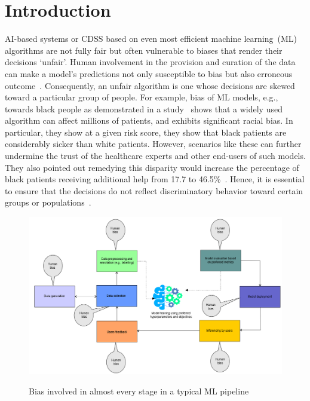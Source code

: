 \section{Introduction} \label{chapter_9:intro}
AI-based systems or CDSS based on even most efficient machine learning~(ML) algorithms are not fully fair but often vulnerable to biases that render their decisions `unfair'. Human involvement in the provision and curation of the data can make a model's predictions not only susceptible to bias but also erroneous outcome~\cite{futia2020integration}. Consequently, an unfair algorithm is one whose decisions are skewed toward a particular group of people. For example, bias of ML models, e.g., towards black people as demonstrated in a study~\cite{obermeyer2019dissecting} shows that a widely used algorithm can affect millions of patients, and exhibits significant racial bias. In particular, they show at a given risk score, they show that black patients are considerably sicker than white patients. However, scenarios like these can further undermine the trust of the healthcare experts and other end-users of such models. They also pointed out remedying this disparity would increase the percentage of black patients receiving additional help from 17.7 to 46.5\%~\cite{obermeyer2019dissecting}. Hence, it is essential to ensure that the decisions do not reflect discriminatory behavior toward certain groups or populations~\cite{mehrabi2019survey}. 

\begin{figure}[h]
		\centering
		\includegraphics[scale=0.5]{images/bias_all.png}
        \label{fig:bias_in_stages}
	\caption{Bias involved in almost every stage in a typical ML pipeline} 
\end{figure}

